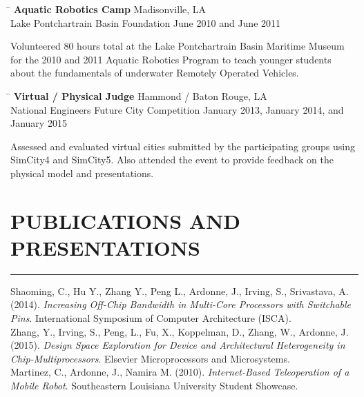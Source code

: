 \documentclass{res}
\begin{document}
\begin{resume}
		
	\begin{tabbing}
		\hspace{4.475in}\= \kill %
		{\bf Aquatic Robotics Camp} \> \hspace{0.475in}Madisonville, LA \\
		Lake Pontchartrain Basin Foundation \> June 2010 and June 2011
	\end{tabbing}\vspace{-20pt}
	\vspace{8pt}Volunteered 80 hours total at the Lake Pontchartrain Basin Maritime Museum for the 2010 and 2011 Aquatic Robotics Program to teach younger students about the fundamentals of underwater Remotely Operated Vehicles.
	
	\begin{tabbing}
		\hspace{3.125in}\= \kill %
		{\bf Virtual / Physical Judge} \> \hspace{1in}Hammond / Baton Rouge, LA \\
		National Engineers Future City Competition \> January 2013, January 2014, and January 2015
	\end{tabbing}\vspace{-20pt}
	\vspace{8pt}Assessed and evaluated virtual cities submitted by the participating groups using SimCity4 and SimCity5. Also attended the event to provide feedback on the physical model and presentations.


\section{PUBLICATIONS AND PRESENTATIONS}
	\vspace{0.005in}	
	\rule{\textwidth}{0.5pt}
	Shaoming, C., Hu Y., Zhang Y., Peng L., Ardonne, J., Irving, S., Srivastava, A. (2014). \textit{Increasing Off-Chip Bandwidth in Multi-Core Processors with Switchable Pins}. International Symposium of Computer Architecture (ISCA).\\
	
	\vspace{-0.25in}
	Zhang, Y., Irving, S., Peng, L., Fu, X., Koppelman, D., Zhang, W., Ardonne, J. (2015).  \textit{Design Space Exploration for Device and Architectural Heterogeneity in Chip-Multiprocessors}.  Elsevier Microprocessors and Microsystems. \\
	
	\vspace{-0.25in}
	Martinez, C., Ardonne, J., Namira M. (2010). \textit{Internet-Based Teleoperation of a Mobile Robot}. Southeastern Louisiana University Student Showcase.
	    

\end{resume}
\end{document}
